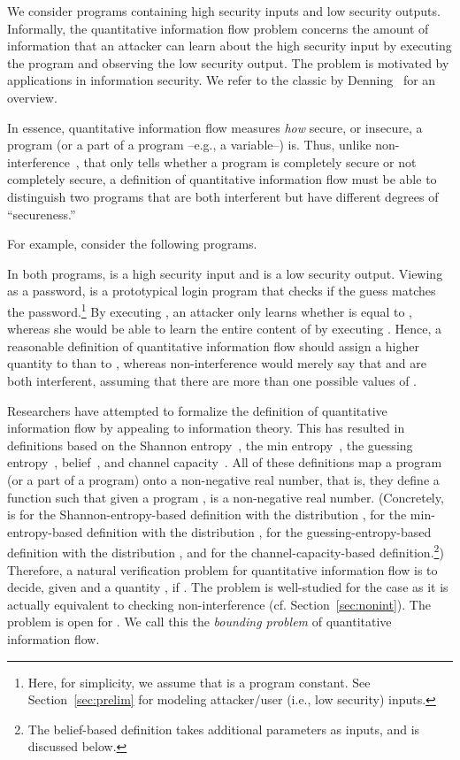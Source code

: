 \documentclass{llncs}
\begin{document}
\label{sec:introduction}

We consider programs containing high security inputs and low security
outputs.  Informally, the quantitative information flow problem
concerns the amount of information that an attacker can learn about
the high security input by executing the program and observing the low
security output.  The problem is motivated by applications in
information security.  We refer to the classic by
Denning~\cite{denning82} for an overview.

In essence, quantitative information flow measures {\em how} secure,
or insecure, a program (or a part of a program --e.g., a variable--)
is.  Thus, unlike
non-interference~\cite{DBLP:conf/sosp/Cohen77,goguen:sp1982}, that
only tells whether a program is completely secure or not completely
secure, a definition of quantitative information flow must be able to
distinguish two programs that are both interferent but have different
degrees of ``secureness.''

For example, consider the following programs.

In both programs,  is a high security input and  is a low
security output.  Viewing  as a password,  is a prototypical
login program that checks if the guess  matches the
password.\footnote{Here, for simplicity, we assume that  is a
  program constant.  See Section~\ref{sec:prelim} for modeling
  attacker/user (i.e., low security) inputs.}  By executing , an
attacker only learns whether  is equal to , whereas she would be
able to learn the entire content of  by executing .  Hence, a
reasonable definition of quantitative information flow should assign a
higher quantity to  than to , whereas non-interference would
merely say that  and  are both interferent, assuming that
there are more than one possible values of .

Researchers have attempted to formalize the definition of quantitative
information flow by appealing to information theory.  This has
resulted in definitions based on the Shannon
entropy~\cite{denning82,clarkjcs2007,malacaria:popl2007}, the min
entropy~\cite{smith09}, the guessing
entropy~\cite{kopf07,DBLP:conf/sp/BackesKR09},
belief~\cite{clarkson:csf2005}, and channel
capacity~\cite{mccamant:pldi2008,malacaria08,NMS2009}.  All of these
definitions map a program (or a part of a program) onto a non-negative
real number, that is, they define a function  such that
given a program ,  is a non-negative real number.
(Concretely,  is  for the
Shannon-entropy-based definition with the distribution ,  for the min-entropy-based definition with the distribution
,  for the guessing-entropy-based definition with
the distribution , and  for the channel-capacity-based
definition.\footnote{The belief-based definition takes additional
  parameters as inputs, and is discussed below.})  Therefore, a
natural verification problem for quantitative information flow is to
decide, given  and a quantity , if .  The problem is well-studied for the case  as it is
actually equivalent to checking non-interference
(cf. Section~\ref{sec:nonint}).  The problem is open for  .  We
call this the {\em bounding problem} of quantitative information flow.
\end{document}
